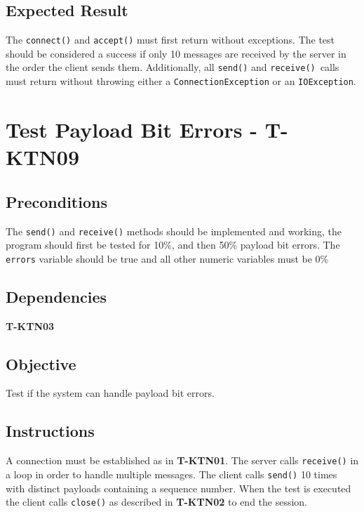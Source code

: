 \documentclass{article}
\begin{document}
\subsection{Expected Result}

The \texttt{connect()} and \texttt{accept()} must first return without
exceptions. The test should be considered a success if only 10 messages are
received by the server in the order the client sends them. Additionally, all 
\texttt{send()} and \texttt{receive() }calls must return without throwing
either a \texttt{ConnectionException} or an \texttt{IOException}.

\section{Test Payload Bit Errors - T-KTN09}

\subsection{Preconditions}

The \texttt{send()} and \texttt{receive()} methods should be implemented and
working, the program should first be tested for 10\%, and then 50\% payload
bit errors. The \texttt{errors} variable should be true and all other
numeric variables must be 0\%

\subsection{Dependencies}

\textbf{T-KTN03}

\subsection{Objective}

Test if the system can handle payload bit errors.

\subsection{Instructions}

A connection must be established as in \textbf{T-KTN01}. The server calls 
\texttt{receive()} in a loop in order to handle multiple messages. The
client calls \texttt{send()} 10 times with distinct payloads containing a
sequence number. When the test is executed the client calls \texttt{close()}
as described in \textbf{T-KTN02} to end the session.
\end{document}
